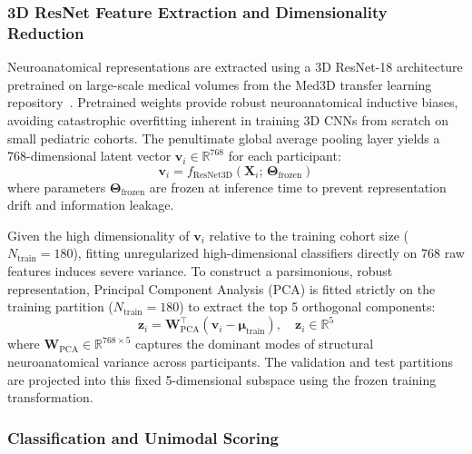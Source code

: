 \documentclass[10pt,letterpaper]{article}
\begin{document}
        \subsubsection*{\textbf{3D ResNet Feature Extraction and Dimensionality Reduction}}

        Neuroanatomical representations are extracted using a 3D ResNet-18 architecture pretrained on large-scale medical volumes from the Med3D transfer learning repository~\cite{ref_med3d}. Pretrained weights provide robust neuroanatomical inductive biases, avoiding catastrophic overfitting inherent in training 3D CNNs from scratch on small pediatric cohorts. The penultimate global average pooling layer yields a 768-dimensional latent vector $\mathbf{v}_i \in \mathbb{R}^{768}$ for each participant:
        \begin{equation} \label{eq:mri_feature}
        \mathbf{v}_i = f_{\text{ResNet3D}}(\mathbf{X}_i;\,\boldsymbol{\Theta}_{\text{frozen}})
        \end{equation}
        where parameters $\boldsymbol{\Theta}_{\text{frozen}}$ are frozen at inference time to prevent representation drift and information leakage.

        Given the high dimensionality of $\mathbf{v}_i$ relative to the training cohort size ($N_{\text{train}} = 180$), fitting unregularized high-dimensional classifiers directly on 768 raw features induces severe variance. To construct a parsimonious, robust representation, Principal Component Analysis (PCA) is fitted strictly on the training partition ($N_{\text{train}} = 180$) to extract the top 5 orthogonal components:
        \begin{equation} \label{eq:pca_proj}
        \mathbf{z}_i = \mathbf{W}_{\text{PCA}}^\top (\mathbf{v}_i - \boldsymbol{\mu}_{\text{train}}),\quad \mathbf{z}_i \in \mathbb{R}^5
        \end{equation}
        where $\mathbf{W}_{\text{PCA}} \in \mathbb{R}^{768 \times 5}$ captures the dominant modes of structural neuroanatomical variance across participants. The validation and test partitions are projected into this fixed 5-dimensional subspace using the frozen training transformation.

        \subsubsection*{\textbf{Classification and Unimodal Scoring}}
\end{document}
